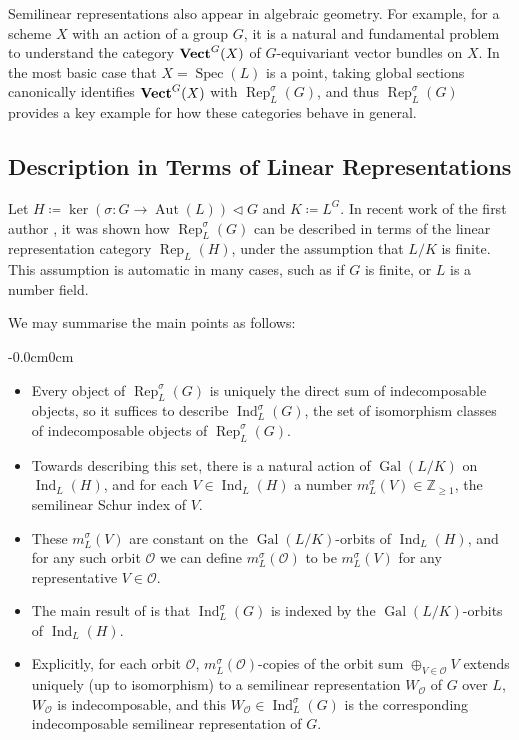 \documentclass[10pt, reqno, hidelinks]{amsart}
\newcommand{\OO}{\mathcal{O}}
\DeclareMathOperator{\Gal}{Gal}
\DeclareMathOperator{\Vect}{\bold{Vect}}
\DeclareMathOperator{\Rep}{Rep}
\DeclareMathOperator{\Ind}{Ind}
\DeclareMathOperator{\Aut}{Aut}
\DeclareMathOperator{\Spec}{Spec}
\newcommand{\bZ}{{\mathbb Z}}
\numberwithin{thm}{subsection}
\theoremstyle{definition}
\begin{document}
Semilinear representations also appear in algebraic geometry. For example, for a scheme $X$ with an action of a group $G$, it is a natural and fundamental problem to understand the category $\Vect^G(X)$ of $G$-equivariant vector bundles on $X$. In the most basic case that $X = \Spec(L)$ is a point, taking global sections canonically identifies $\Vect^G(X)$ with $\Rep_L^{\sigma}(G)$, and thus $\Rep_L^{\sigma}(G)$ provides a key example for how these categories behave in general.

\subsection*{Description in Terms of Linear Representations} Let $H \coloneqq \ker(\sigma \colon G \rightarrow \Aut(L)) \triangleleft G$ and $K \coloneqq L^G$.
In recent work of the first author \cite{TAYSchur}, it was shown how $\Rep_L^{\sigma}(G)$ can be described in terms of the linear representation category $\Rep_L(H)$, under the assumption that $L / K$ is finite. This assumption is automatic in many cases, such as if $G$ is finite, or $L$ is a number field.

We may summarise the main points as follows:

\begin{adjustwidth}{-0.0cm}{0cm}
\begin{itemize}
	\item Every object of $\Rep_L^{\sigma}(G)$ is uniquely the direct sum of indecomposable objects, so it suffices to describe $\Ind_L^{\sigma}(G)$, the set of isomorphism classes of indecomposable objects of $\Rep_L^{\sigma}(G)$.
	\item Towards describing this set, there is a natural action of $\Gal(L/K)$ on $\Ind_L(H)$, and for each $V \in \Ind_L(H)$ a number $m_L^{\sigma}(V) \in \bZ_{\geq 1}$, the semilinear Schur index of $V$.
	\item  These $m_L^{\sigma}(V)$ are constant on the $\Gal(L/K)$-orbits of $\Ind_L(H)$, and for any such orbit $\OO$ we can define $m_L^{\sigma}(\OO)$ to be $m_L^{\sigma}(V)$ for any representative $V \in \OO$.
	\item The main result of \cite{TAYSchur} is that $\Ind_L^{\sigma}(G)$ is indexed by the $\Gal(L/K)$-orbits of $\Ind_L(H)$.
	\item Explicitly, for each orbit $\OO$, $m_L^{\sigma}(\OO)$-copies of the orbit sum $\oplus_{V \in \OO} V$ extends uniquely (up to isomorphism) to a semilinear representation $W_{\OO}$ of $G$ over $L$, $W_{\OO}$ is indecomposable, and this $W_{\OO} \in \Ind_L^{\sigma}(G)$ is the corresponding indecomposable semilinear representation of $G$.
\end{itemize}
\end{adjustwidth}
\end{document}
